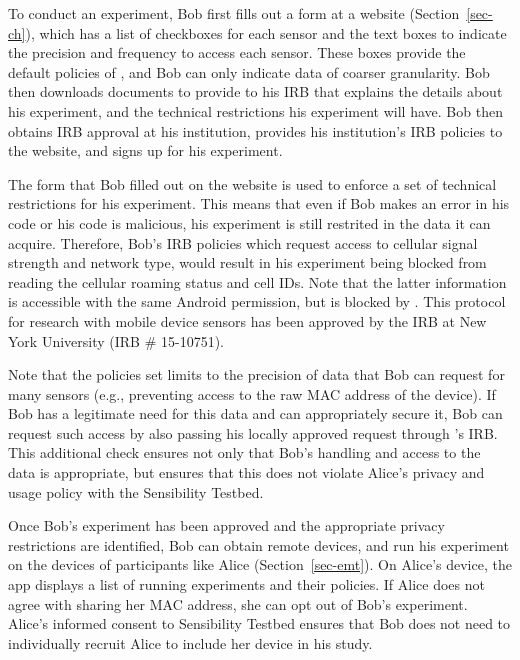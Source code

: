 To conduct an experiment, Bob first fills out a form at a \sysname website 
(Section~\ref{sec-ch}), which has a list of checkboxes for each sensor 
and the text boxes to indicate the precision and frequency to access 
each sensor. These boxes provide the default policies of \sysname, and 
Bob can only indicate data of coarser granularity. Bob then downloads 
documents to provide to his IRB that 
explains the details about his experiment, \sysname and the technical 
restrictions his experiment will have. Bob then obtains IRB approval at 
his institution, provides his institution's IRB policies to the 
\sysname website, and signs up for his experiment. 

The form that Bob filled out on the \sysname website is used to
enforce a set of technical restrictions for his experiment.  This means
that even if Bob makes an error in his code or his code is malicious, his 
experiment is still restrited in the data it can acquire. 
 Therefore, Bob's IRB 
policies which request access to cellular signal strength and network type, would result 
in his experiment being blocked from reading the cellular roaming status and cell 
IDs. Note that the latter information is accessible with the same 
Android permission, but is blocked by \sysname.  This
protocol for research with mobile device sensors has been approved by
the IRB at New York University (IRB \# 15-10751).  

Note that the policies set limits to the precision of data that Bob can request
for many sensors (e.g., preventing access to the raw MAC address of the device).
If Bob has a legitimate need for this data and can appropriately secure it,
Bob can request such access by also passing his locally approved request 
through \sysname's IRB.  This additional check ensures not only that Bob's 
handling and access to the data is appropriate, but ensures that this does
not violate Alice's privacy and usage policy with the Sensibility Testbed.

Once Bob's experiment has been approved and the appropriate privacy
restrictions are identified, Bob can obtain remote devices, and run his experiment on the
devices of participants like Alice (Section~\ref{sec-emt}). On Alice's device, the app displays a 
list of running experiments and their policies. If Alice does not agree with
sharing her MAC address, she can opt out of Bob's experiment. 
Alice's informed consent to Sensibility Testbed
ensures that Bob does not need to individually recruit Alice to include
her device in his study.

